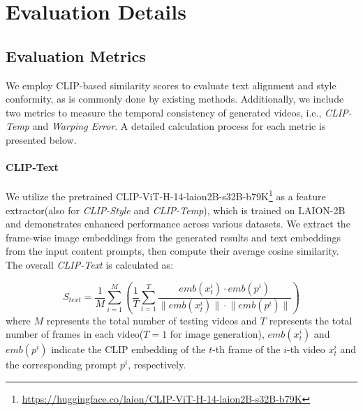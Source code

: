 %
%

\section{Evaluation Details}
\label{sec:supp_eval}
\subsection{Evaluation Metrics}

We employ CLIP-based similarity scores to evaluate text alignment and style conformity, as is commonly done by existing methods. Additionally, we include two metrics to measure the temporal consistency of generated videos, i.e., \textit{CLIP-Temp} and \textit{Warping Error}. A detailed calculation process for each metric is presented below.

\paragraph{CLIP-Text} We utilize the pretrained CLIP-ViT-H-14-laion2B-s32B-b79K\footnote{\url{https://huggingface.co/laion/CLIP-ViT-H-14-laion2B-s32B-b79K}} as a feature extractor(also for \textit{CLIP-Style} and \textit{CLIP-Temp}), which is trained on LAION-2B and demonstrates enhanced performance across various datasets. We extract the frame-wise image embeddings from the generated results and text embeddings from the input content prompts, then compute their average cosine similarity. The overall \textit{CLIP-Text} is calculated as:

\begin{equation}
    S_{text} = \frac{1}{M}\sum_{i = 1}^{M}(\frac{1}{T}\sum_{t=1}^{T}\frac{emb(x_t^i) \cdot emb(p^i)}{\lVert emb(x_t^i) \rVert \cdot \lVert emb(p^i) \rVert})
\end{equation}
where $M$ represents the total number of testing videos and $T$ represents the total number of frames in each video($T = 1$ for image generation), $emb(x_t^i)$ and $emb(p^i)$ indicate the CLIP embedding of the $t$-th frame of the $i$-th video $x_t^i$ and the corresponding prompt $p^i$, respectively.

